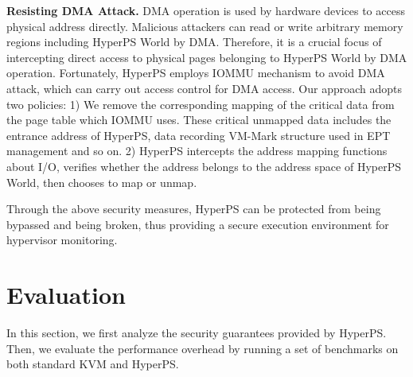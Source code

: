 \documentclass[conference]{IEEEtran}
\begin{document}
\textbf{Resisting DMA Attack.}
DMA operation is used by hardware devices to access physical address directly. Malicious attackers can read or write arbitrary memory regions including HyperPS World by DMA. Therefore, it is a crucial focus of intercepting direct access to physical pages belonging to HyperPS World by DMA operation. 
Fortunately, HyperPS employs IOMMU mechanism to avoid DMA attack, which can carry out access control for DMA access. Our approach adopts two policies: 1) We remove the corresponding mapping of the critical data from the page table which IOMMU uses. These critical unmapped data includes the entrance address of HyperPS, data recording VM-Mark structure used in EPT management and so on. 2) HyperPS intercepts the address mapping functions about I/O, verifies whether the address belongs to the address space of HyperPS World, then chooses to map or unmap.


Through the above security measures, HyperPS can be protected from being bypassed and being broken, thus providing a secure execution environment for hypervisor monitoring.





%
%

%
%





\section{Evaluation}\label{sec:evaluation}
In this section, we first analyze the security guarantees provided by HyperPS. Then, we evaluate the performance overhead by running a set of benchmarks on both standard KVM and HyperPS.
\end{document}

